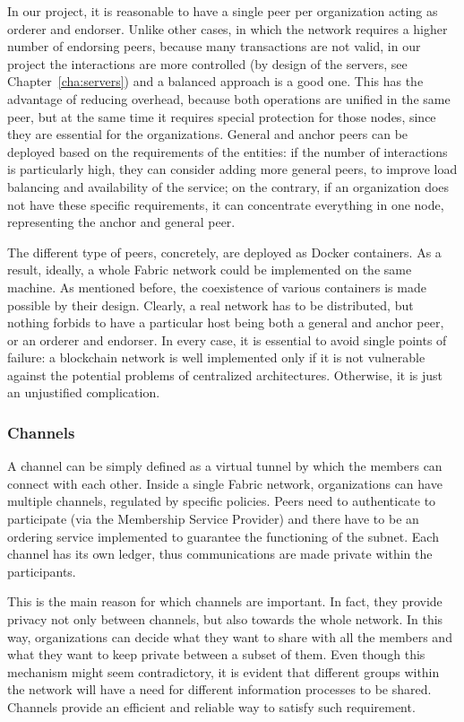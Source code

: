 In our project, it is reasonable to have a single peer per organization acting as orderer and endorser. Unlike other cases, in which the network requires a higher number of endorsing peers, because many transactions are not valid, in our project the interactions are more controlled (by design of the servers, see Chapter~\ref{cha:servers}) and a balanced approach is a good one. This has the advantage of reducing overhead, because both operations are unified in the same peer, but at the same time it requires special protection for those nodes, since they are essential for the organizations. General and anchor peers can be deployed based on the requirements of the entities: if the number of interactions is particularly high, they can consider adding more general peers, to improve load balancing and availability of the service; on the contrary, if an organization does not have these specific requirements, it can concentrate everything in one node, representing the anchor and general peer.

The different type of peers, concretely, are deployed as Docker containers. As a result, ideally, a whole Fabric network could be implemented on the same machine. As mentioned before, the coexistence of various containers is made possible by their design. Clearly, a real network has to be distributed, but nothing forbids to have a particular host being both a general and anchor peer, or an orderer and endorser. In every case, it is essential to avoid single points of failure: a blockchain network is well implemented only if it is not vulnerable against the potential problems of centralized architectures. Otherwise, it is just an unjustified complication.

\subsubsection{Channels}
A channel can be simply defined as a virtual tunnel by which the members can connect with each other. Inside a single Fabric network, organizations can have multiple channels, regulated by specific policies. Peers need to authenticate to participate (via the Membership Service Provider) and there have to be an ordering service implemented to guarantee the functioning of the subnet. Each channel has its own ledger, thus communications are made private within the participants.

This is the main reason for which channels are important. In fact, they provide privacy not only between channels, but also towards the whole network. In this way, organizations can decide what they want to share with all the members and what they want to keep private between a subset of them.
Even though this mechanism might seem contradictory, it is evident that different groups within the network will have a need for different information processes to be shared. Channels provide an efficient and reliable way to satisfy such requirement.

